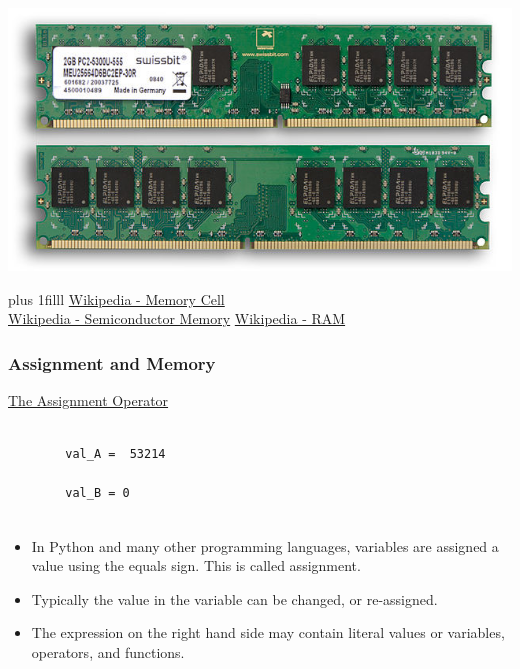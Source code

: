 \documentclass[fleqn]{beamer} %
\newcommand{\sectiontitleIII}{Assignment and Memory}
\newcommand{\btVFill}{\vskip0pt plus 1filll}
\begin{document}
\begin{frame}
		\includegraphics[scale=.50]{ramstick.jpg}
		
		\btVFill
		\href{https://en.wikipedia.org/wiki/Memory_cell_(computing)}{Wikipedia - Memory Cell} \\
		\href{https://en.wikipedia.org/wiki/Semiconductor_memory}{Wikipedia - Semiconductor Memory}
		\href{https://en.wikipedia.org/wiki/Random-access_memory}{Wikipedia - RAM}

	\end{frame}

	\begin{frame}[containsverbatim] \small
	\frametitle{\sectiontitleIII}

	\underline{The Assignment Operator} \vspace{5mm} \\

	\begin{lstlisting}
	
		val_A =  53214
	
		val_B = 0
	
	\end{lstlisting}
	
	\begin{itemize}
		\item In Python and many other programming languages, variables are assigned a value using the equals sign. This is called {\BL assignment}.
		\item Typically the value in the variable can be changed, or re-assigned. 
		\item The expression on the right hand side may contain literal values or variables, operators, and functions. 
		
		
	\end{itemize}
	
	
	\end{frame}
\end{document}
